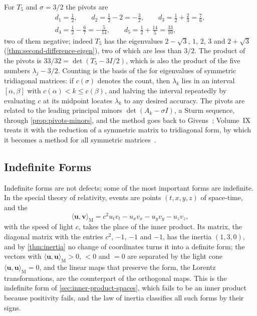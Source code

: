 For $T_5$ and $\sigma=3/2$ the pivots are
\begin{gather*}
d_1=\frac12,\qquad d_2=\frac12-2=-\frac32,\qquad d_3=\frac12+\frac23=\frac76,\\
d_4=\frac12-\frac67=-\frac5{14},\qquad d_5=\frac12+\frac{14}5=\frac{33}{10},
\end{gather*}
two of them negative; indeed $T_5$ has the eigenvalues $2-\sqrt3$, $1$, $2$, $3$ and $2+\sqrt3$ (\cref{thm:second-difference-eigen}), two of which are less than $3/2$. The product of the pivots is $33/32=\det(T_5-3I/2)$, which is also the product of the five numbers $\lambda_j-3/2$. Counting is the basis of the  for eigenvalues of symmetric tridiagonal matrices: if $c(\sigma)$ denotes the count, then $\lambda_k$ lies in an interval $[\alpha,\beta]$ with $c(\alpha)<k\le c(\beta)$, and halving the interval repeatedly by evaluating $c$ at its midpoint locates $\lambda_k$ to any desired accuracy. The pivots are related to the leading principal minors $\det(A_k-\sigma I)$, a Sturm sequence, through \cref{prop:pivots-minors}, and the method goes back to Givens~\cite{givens1954}; Volume~IX treats it with the reduction of a symmetric matrix to tridiagonal form, by which it becomes a method for all symmetric matrices~\cite[Sect.~8.4]{golub2013}.

\subsection{Indefinite Forms}

Indefinite forms are not defects; some of the most important forms are indefinite. In the special theory of relativity, events are points $(t,x,y,z)$ of space-time, and the 
\[
\langle\mathbf u,\mathbf v\rangle_{\mathrm M}=c^2u_tv_t-u_xv_x-u_yv_y-u_zv_z ,
\]
with the speed of light $c$, takes the place of the inner product. Its matrix, the diagonal matrix with the entries $c^2$, $-1$, $-1$ and $-1$, has the inertia $(1,3,0)$, and by \cref{thm:inertia} no change of coordinates turns it into a definite form; the vectors with $\langle\mathbf u,\mathbf u\rangle_{\mathrm M}>0$, $<0$ and $=0$ are separated by the light cone $\langle\mathbf u,\mathbf u\rangle_{\mathrm M}=0$, and the linear maps that preserve the form, the Lorentz transformations, are the counterpart of the orthogonal maps. This is the indefinite form of \cref{sec:inner-product-spaces}, which fails to be an inner product because positivity fails, and the law of inertia classifies all such forms by their signs.


